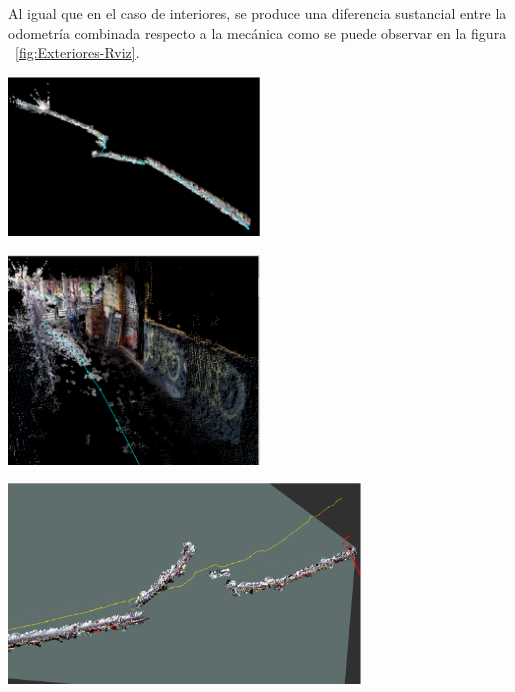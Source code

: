 Al igual que en el caso de interiores, se produce una diferencia sustancial
entre la odometría combinada respecto a la mecánica como se puede observar en la
figura ~\ref{fig:Exteriores-Rviz}.

\begin{minipage}{\linewidth}
    \centering
    \includegraphics[width=0.5\textwidth]{images/cap4/Exteriores-rtabmap-lejos.eps}
    \label{fig:Exteriores-Rtabmap-Lejos}
\end{minipage}

\begin{minipage}{\linewidth}
    \centering
    \includegraphics[width=0.5\textwidth]{images/cap4/Exteriores-rtabmap-cerca.eps}
    \label{fig:Exteriores-Rtabmap-Cerca}
\end{minipage}

\begin{minipage}{\linewidth}
    \centering
    \includegraphics[width=0.7\textwidth]{images/cap4/Exteriores-rviz.eps}
    \label{fig:Exteriores-Rviz}
\end{minipage}


